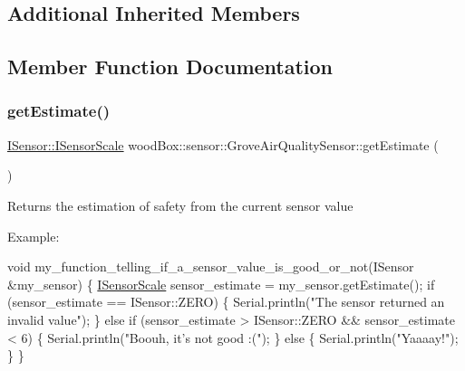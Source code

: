 \subsection*{Additional Inherited Members}


\subsection{Member Function Documentation}
\mbox{\label{classwood_box_1_1sensor_1_1_grove_air_quality_sensor_a457e99f530b79f14db1de00cba3e81ff}} 
\subsubsection{\texorpdfstring{get\+Estimate()}{getEstimate()}}
{\footnotesize\ttfamily \mbox{\hyperlink{classwood_box_1_1sensor_1_1_i_sensor_aa377bda61ed0d4a1d7e1a7bffe459452}{I\+Sensor\+::\+I\+Sensor\+Scale}} wood\+Box\+::sensor\+::\+Grove\+Air\+Quality\+Sensor\+::get\+Estimate (\begin{DoxyParamCaption}{ }\end{DoxyParamCaption})\hspace{0.3cm}{\ttfamily [virtual]}}

Returns the estimation of safety from the current sensor value

Example\+:


\begin{DoxyCode}
\textcolor{keywordtype}{void} my\_function\_telling\_if\_a\_sensor\_value\_is\_good\_or\_not(ISensor &my\_sensor) \{
  \mbox{\hyperlink{classwood_box_1_1sensor_1_1_i_sensor_aa377bda61ed0d4a1d7e1a7bffe459452}{ISensorScale}} sensor\_estimate = my\_sensor.getEstimate();
  \textcolor{keywordflow}{if} (sensor\_estimate == ISensor::ZERO) \{
    Serial.println(\textcolor{stringliteral}{"The sensor returned an invalid value"});
  \}
  \textcolor{keywordflow}{else} \textcolor{keywordflow}{if} (sensor\_estimate > ISensor::ZERO && sensor\_estimate < 6) \{
    Serial.println(\textcolor{stringliteral}{"Boouh, it's not good :("});
  \}
  \textcolor{keywordflow}{else} \{
    Serial.println(\textcolor{stringliteral}{"Yaaaay!"});
  \}
\}
\end{DoxyCode}
 

